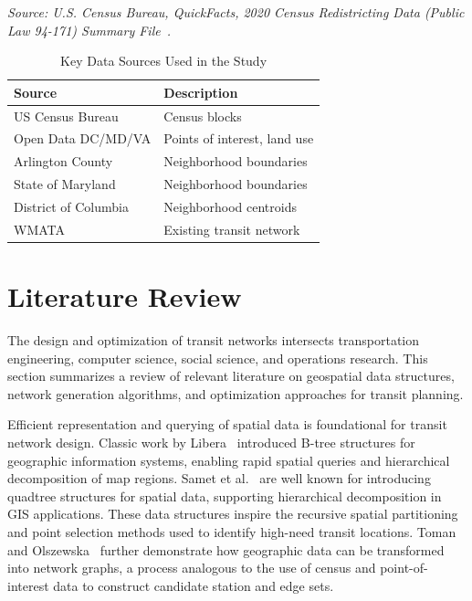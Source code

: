 \documentclass[sigconf,nonacm]{acmart}
\begin{document}
\noindent\textit{Source: U.S. Census Bureau, QuickFacts, 2020 Census Redistricting Data (Public Law 94-171) Summary File~\cite{lit:census}.} 


\begin{table}[h]
\caption{Key Data Sources Used in the Study}
\label{tab:datasources}
\begin{tabular}{ll}
\toprule
Source & Description \\
\midrule
US Census Bureau & Census blocks \\
Open Data DC/MD/VA & Points of interest, land use \\
Arlington County & Neighborhood boundaries \\
State of Maryland & Neighborhood boundaries \\
District of Columbia & Neighborhood centroids \\
WMATA & Existing transit network \\
\bottomrule
\end{tabular}
\end{table}

\section{Literature Review}

The design and optimization of transit networks intersects transportation engineering, computer science, social science, and operations research. This section summarizes a review of relevant literature on geospatial data structures, network generation algorithms, and optimization approaches for transit planning.

Efficient representation and querying of spatial data is foundational for transit network design. Classic work by Libera~\cite{bib:libera1986btrees} introduced B-tree structures for geographic information systems, enabling rapid spatial queries and hierarchical decomposition of map regions. Samet et al.~\cite{bib:samet1984quadtrees} are well known for introducing quadtree structures for spatial data, supporting hierarchical decomposition in GIS applications. These data structures inspire the recursive spatial partitioning and point selection methods used to identify high-need transit locations. Toman and Olszewska~\cite{toman2014algorithm} further demonstrate how geographic data can be transformed into network graphs, a process analogous to the use of census and point-of-interest data to construct candidate station and edge sets.
\end{document}

